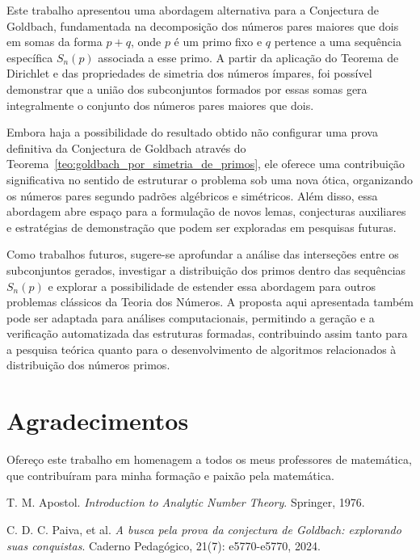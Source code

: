 \documentclass[a4paper,11pt]{article}
\theoremstyle{definition}
\theoremstyle{remark}
\begin{document}
\begin{otherlanguage}{brazil}
	Este trabalho apresentou uma abordagem alternativa para a Conjectura de Goldbach, fundamentada na decomposição dos números pares maiores que dois em somas da forma \(p + q\), onde \(p\) é um primo fixo e \(q\) pertence a uma sequência específica \(S_n(p)\) associada a esse primo. A partir da aplicação do Teorema de Dirichlet e das propriedades de simetria dos números ímpares, foi possível demonstrar que a união dos subconjuntos formados por essas somas gera integralmente o conjunto dos números pares maiores que dois.
	
	Embora haja a possibilidade do resultado obtido não configurar uma prova definitiva da Conjectura de Goldbach através do Teorema~\ref{teo:goldbach_por_simetria_de_primos}, ele oferece uma contribuição significativa no sentido de estruturar o problema sob uma nova ótica, organizando os números pares segundo padrões algébricos e simétricos. Além disso, essa abordagem abre espaço para a formulação de novos lemas, conjecturas auxiliares e estratégias de demonstração que podem ser exploradas em pesquisas futuras.
	
	Como trabalhos futuros, sugere-se aprofundar a análise das interseções entre os subconjuntos gerados, investigar a distribuição dos primos dentro das sequências \(S_n(p)\) e explorar a possibilidade de estender essa abordagem para outros problemas clássicos da Teoria dos Números. A proposta aqui apresentada também pode ser adaptada para análises computacionais, permitindo a geração e a verificação automatizada das estruturas formadas, contribuindo assim tanto para a pesquisa teórica quanto para o desenvolvimento de algoritmos relacionados à distribuição dos números primos.
	
	
	\section*{Agradecimentos}
	
	Ofereço este trabalho em homenagem a todos os meus professores de matemática, que contribuíram para minha formação e paixão pela matemática.
	
	
	\begin{thebibliography}{9}
		
		T. M. Apostol.
		\textit{Introduction to Analytic Number Theory}.
		Springer, 1976.
		
		C. D. C. Paiva, et al. \textit{A busca pela prova da conjectura de Goldbach: explorando suas conquistas}. Caderno Pedagógico, 21(7): e5770-e5770, 2024.
		

\end{thebibliography}
\end{otherlanguage}
\end{document}
